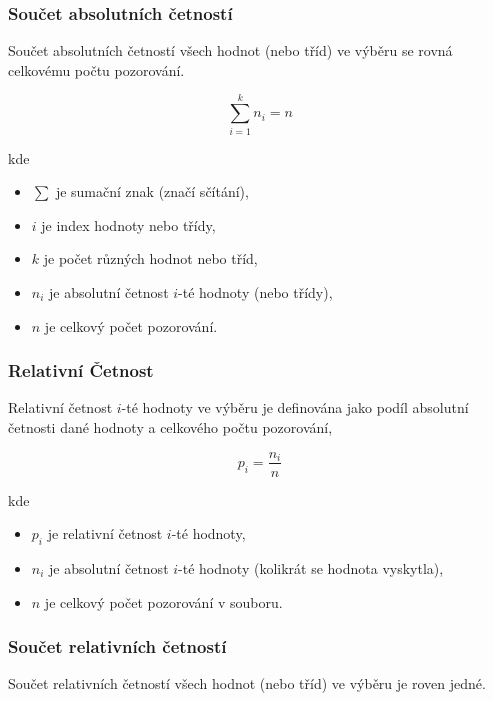 \documentclass[a4paper, 11pt]{article}
\begin{document}
\subsubsection{Součet absolutních četností}

Součet absolutních četností všech hodnot (nebo tříd) ve výběru
se rovná celkovému počtu pozorování.

\begin{equation*}
	\sum_{i=1}^{k} n_i = n
\end{equation*}

kde

\begin{itemize}[noitemsep]
	\item $\sum$ je sumační znak (značí sčítání),
	\item $i$ je index hodnoty nebo třídy,
	\item $k$ je počet různých hodnot nebo tříd,
	\item $n_i$ je absolutní četnost $i$-té hodnoty (nebo třídy),
	\item $n$ je celkový počet pozorování.
\end{itemize}

\subsubsection{Relativní Četnost}
Relativní četnost $i$-té hodnoty ve výběru je definována jako podíl
absolutní četnosti dané hodnoty a celkového počtu pozorování,

\begin{equation*}
	p_i = \frac{n_i}{n}
\end{equation*}

kde

\begin{itemize}[noitemsep]
	\item $p_i$ je relativní četnost $i$-té hodnoty,
	\item $n_i$ je absolutní četnost $i$-té hodnoty (kolikrát se hodnota vyskytla),
	\item $n$ je celkový počet pozorování v souboru.
\end{itemize}

\subsubsection{Součet relativních četností}

Součet relativních četností všech hodnot (nebo tříd) ve výběru
je roven jedné.
\end{document}
